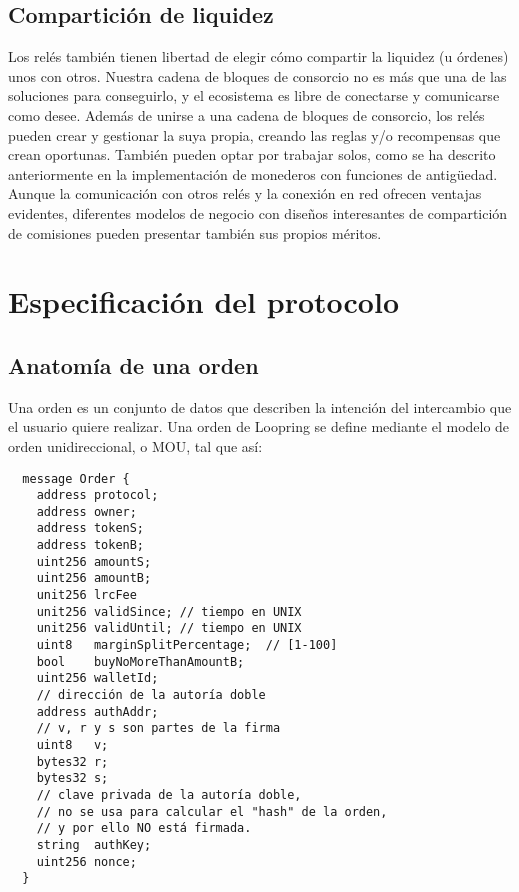 \documentclass[UTF8,nofonts]{article}
\begin{document}
\begin{multicols}{2}
\subsection{Compartición de liquidez\label{sec:liquidity_sharing}}
Los relés también tienen libertad de elegir cómo compartir la liquidez (u órdenes) unos con otros. Nuestra cadena de bloques de consorcio no es más que una de las soluciones para conseguirlo, y el ecosistema es libre de conectarse y comunicarse como desee. Además de unirse a una cadena de bloques de consorcio, los relés pueden crear y gestionar la suya propia, creando las reglas y/o recompensas que crean oportunas. También pueden optar por trabajar solos, como se ha descrito anteriormente en la implementación de monederos con funciones de antigüedad. Aunque la comunicación con otros relés y la conexión en red ofrecen ventajas evidentes, diferentes modelos de negocio con diseños interesantes de compartición de comisiones pueden presentar también sus propios méritos.


\section{Especificación del protocolo\label{sec:protocol}}

\subsection{Anatomía de una orden\label{anatomy}}
Una orden es un conjunto de datos que describen la intención del intercambio que el usuario quiere realizar. Una orden de Loopring se define mediante el modelo de orden unidireccional, o MOU, tal que así:

\begin{verbatim}
  message Order {
    address protocol;
    address owner;
    address tokenS;
    address tokenB;
    uint256 amountS;
    uint256 amountB;
    unit256 lrcFee
    unit256 validSince; // tiempo en UNIX
    unit256 validUntil; // tiempo en UNIX
    uint8   marginSplitPercentage;  // [1-100]
    bool    buyNoMoreThanAmountB;
    uint256 walletId;
    // dirección de la autoría doble
    address authAddr;
   	// v, r y s son partes de la firma
    uint8   v;       
    bytes32 r;
    bytes32 s;
    // clave privada de la autoría doble,
    // no se usa para calcular el "hash" de la orden,
    // y por ello NO está firmada.
    string  authKey;          
    uint256 nonce;
  }
\end{verbatim}



\end{multicols}
\end{document}
